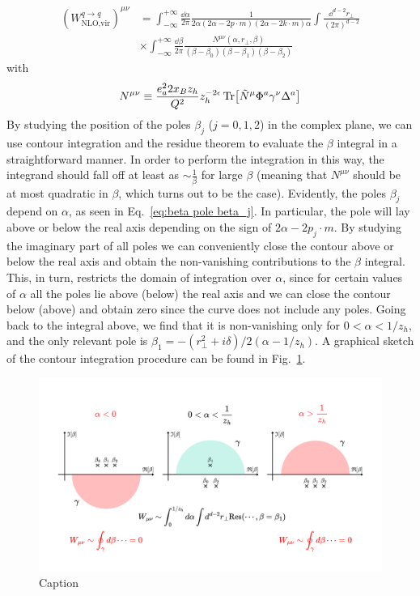 \begin{equation}
\begin{aligned}
       (W^{q \to q}_{\text{NLO,vir}})^{\mu\nu} &=\int_{-\infty}^{+\infty}\frac{\dd \alpha}{2\pi} \frac{1}{2\alpha(2\alpha-2p \cdot m)(2\alpha-2 k \cdot m)\alpha}\int \frac{\dd^{d-2}r_\perp}{(2\pi)^{d-2}}\\
       &\times\int_{-\infty}^{+\infty}\frac{\dd \beta}{2\pi}\frac{N^{\mu\nu}(\alpha,r_\perp,\beta)}{(\beta-\beta_0)(\beta-\beta_1)(\beta-\beta_2)}
\end{aligned}
\end{equation}
with
\begin{equation}
    N^{\mu\nu}\equiv \frac{e_a^2 2x_B z_h }{Q^2}z_h^{-2\epsilon}\Tr[\tilde N^\mu\Phi^a\gamma^\nu \Delta^a]
\end{equation}
By studying the position of the poles $\beta_j$ ($j=0,1,2$) in the complex plane, we can use contour integration and the residue theorem to evaluate the $\beta$ integral in a straightforward manner. In order to perform the integration in this way, the integrand should fall off at least as $\sim\frac{1}{\beta}$ for large $\beta$ (meaning that $N^{\mu\nu}$ should be at most quadratic in $\beta$, which turns out to be the case). Evidently, the poles $\beta_j$ depend on $\alpha$, as seen in Eq.~\eqref{eq:beta pole beta_j}. In particular, the pole will lay above or below the real axis depending on the sign of $2\alpha-2p_j\cdot m$. By studying the imaginary part of all poles we can conveniently close the contour above or below the real axis and obtain the non-vanishing contributions to the $\beta$ integral. This, in turn, restricts the domain of integration over $\alpha$, since for certain values of $\alpha$ all the poles lie above (below) the real axis and we can close the contour below (above) and obtain zero since the curve does not include any poles. Going back to the integral above, we find that it is non-vanishing only for $0<\alpha<1/z_h$, and the only relevant pole is $\beta_1 = -(r_\perp^2+i\delta)/2(\alpha-1/z_h)$. A graphical sketch of the contour integration procedure can be found in Fig.~\ref{fig:beta contour}.
\begin{figure}
    \centering
    \includegraphics[width=0.99\linewidth]{fig/beta contour.pdf}
    \caption{Caption}
    \label{fig:beta contour}
\end{figure}
